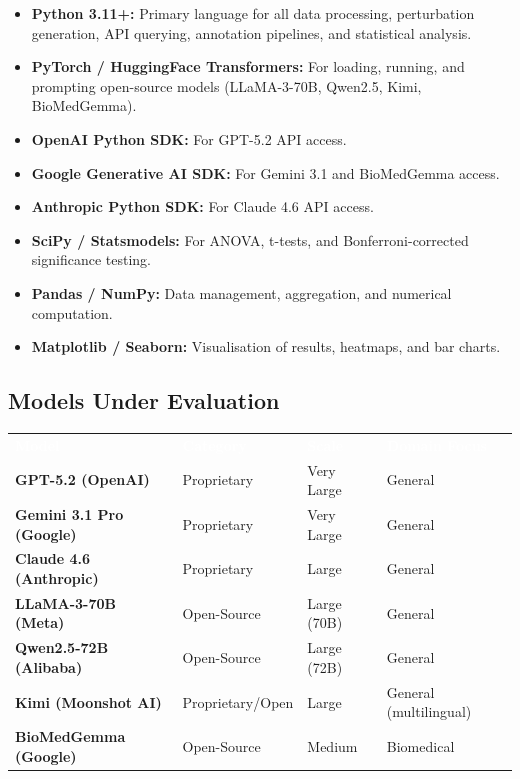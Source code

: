 \documentclass[12pt, a4paper]{article}
\begin{document}
\begin{itemize}
  \item \textbf{Python 3.11+:} Primary language for all data processing, perturbation generation, API querying, annotation pipelines, and statistical analysis.
  \item \textbf{PyTorch / HuggingFace Transformers:} For loading, running, and prompting open-source models (LLaMA-3-70B, Qwen2.5, Kimi, BioMedGemma).
  \item \textbf{OpenAI Python SDK:} For GPT-5.2 API access.
  \item \textbf{Google Generative AI SDK:} For Gemini 3.1 and BioMedGemma access.
  \item \textbf{Anthropic Python SDK:} For Claude 4.6 API access.
  \item \textbf{SciPy / Statsmodels:} For ANOVA, t-tests, and Bonferroni-corrected significance testing.
  \item \textbf{Pandas / NumPy:} Data management, aggregation, and numerical computation.
  \item \textbf{Matplotlib / Seaborn:} Visualisation of results, heatmaps, and bar charts.
\end{itemize}

\subsection{Models Under Evaluation}

\begin{center}
\renewcommand{\arraystretch}{1.4}
\begin{tabularx}{0.95\linewidth}{>{\bfseries\small}p{3.2cm} >{\small}p{2.6cm} >{\small}p{2.2cm} >{\small}X}
\rowcolor{rowblue}
\textcolor{white}{\textbf{Model}} & \textcolor{white}{\textbf{Category}} & \textcolor{white}{\textbf{Scale}} & \textcolor{white}{\textbf{Domain Focus}} \\
\rowcolor{rowalt}
GPT-5.2 (OpenAI) & Proprietary & Very Large & General \\
Gemini 3.1 Pro (Google) & Proprietary & Very Large & General \\
\rowcolor{rowalt}
Claude 4.6 (Anthropic) & Proprietary & Large & General \\
LLaMA-3-70B (Meta) & Open-Source & Large (70B) & General \\
\rowcolor{rowalt}
Qwen2.5-72B (Alibaba) & Open-Source & Large (72B) & General \\
Kimi (Moonshot AI) & Proprietary/Open & Large & General (multilingual) \\
\rowcolor{rowalt}
BioMedGemma (Google) & Open-Source & Medium & Biomedical \\
\end{tabularx}
\end{center}
\end{document}
